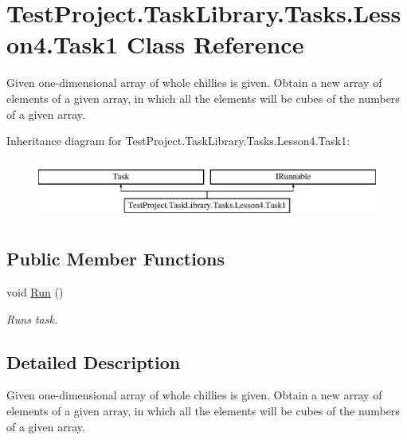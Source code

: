 \hypertarget{class_test_project_1_1_task_library_1_1_tasks_1_1_lesson4_1_1_task1}{}\section{Test\+Project.\+Task\+Library.\+Tasks.\+Lesson4.\+Task1 Class Reference}
\label{class_test_project_1_1_task_library_1_1_tasks_1_1_lesson4_1_1_task1}


Given one-\/dimensional array of whole chillies is given. Obtain a new array of elements of a given array, in which all the elements will be cubes of the numbers of a given array.  


Inheritance diagram for Test\+Project.\+Task\+Library.\+Tasks.\+Lesson4.\+Task1\+:\begin{figure}[H]
\begin{center}
\leavevmode
\includegraphics[height=2.000000cm]{class_test_project_1_1_task_library_1_1_tasks_1_1_lesson4_1_1_task1}
\end{center}
\end{figure}
\subsection*{Public Member Functions}
\begin{DoxyCompactItemize}
\item 
void \mbox{\hyperlink{class_test_project_1_1_task_library_1_1_tasks_1_1_lesson4_1_1_task1_a7bfcb0a454e481f67e1de59ffc34ecd4}{Run}} ()
\begin{DoxyCompactList}\small\item\em Runs task. \end{DoxyCompactList}\end{DoxyCompactItemize}


\subsection{Detailed Description}
Given one-\/dimensional array of whole chillies is given. Obtain a new array of elements of a given array, in which all the elements will be cubes of the numbers of a given array. 




